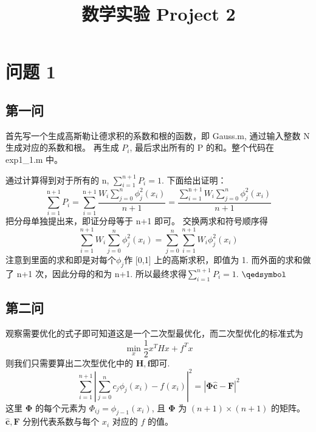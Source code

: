 \documentclass[11pt]{ctexart}
\title{数学实验 Project 2}
\begin{document}
	\maketitle
	\section{问题 1}

	\subsection{第一问}
	首先写一个生成高斯勒让德求积的系数和根的函数，即 Gauss.m, 通过输入整数 N 生成对应的系数和根。
	再生成 $P_i$, 最后求出所有的 P 的和。整个代码在 exp1\_1.m 中。

	通过计算得到对于所有的 n, \(\sum_{i=1}^{n+1}P_i=1\).
	下面给出证明：
	\begin{equation}
		\sum_{i=1}^{\mathrm{n}+1} P_{i}=\sum_{i=1}^{\mathrm{n}+1} \frac{W_{i} \sum_{j=0}^{n} \phi_{j}^{2}\left(x_{i}\right)}{n+1}
		= \frac{\sum_{i=1}^{\mathrm{n}+1}W_{i} \sum_{j=0}^{n} \phi_{j}^{2}\left(x_{i}\right)}{n+1}
	\end{equation}
	把分母单独提出来，即证分母等于 n+1 即可。
	交换两求和符号顺序得
	\begin{equation}
		\sum_{i=1}^{n+1}W_{i} \sum_{j=0}^{n} \phi_{j}^{2}\left(x_{i}\right)=\sum_{j=0}^{n}\sum_{i=1}^{n+1}W_i\phi_{j}^2(x_i)
	\end{equation}
	注意到里面的求和即是对每个$\phi_j$作 [0,1] 上的高斯求积，即值为 1.
	而外面的求和做了 n+1 次，因此分母的和为 n+1.
	所以最终求得\(\sum_{i=1}^{n+1}P_i=1\). \hfill \(\qedsymbol\)

	\subsection{第二问}
	观察需要优化的式子即可知道这是一个二次型最优化，而二次型优化的标准式为
	\begin{equation}
		\min _{x} \frac{1}{2} x^{T} H x+f^{T} x
	\end{equation}
	则我们只需要算出二次型优化中的 $\mathbf{H,f}$即可.
	\begin{equation}
		\sum_{i=1}^{n+1}\left|\sum_{j=0}^{n} c_{j} \phi_{j}\left(x_{i}\right)-f\left(x_{i}\right)\right|^{2}=
		|\mathbf{\Phi} \mathbf {\hat{c}}-\mathbf F|^2
	\end{equation}
	这里 $\mathbf{\Phi}$ 的每个元素为 $\Phi_{ij}=\phi _{j-1}(x_i)$, 且 \(\mathbf{\Phi}\) 为 \((n+1)\times(n+1)\) 的矩阵。
	\(\mathbf{\hat{c},F}\) 分别代表系数与每个 \(x_i\) 对应的 \(f\) 的值。
\end{document}
